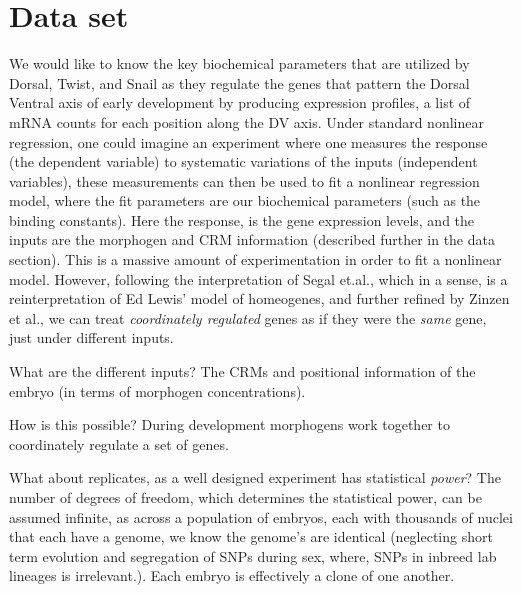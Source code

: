  \section{ Data set }

We would like to know the key biochemical parameters that are utilized by Dorsal, Twist, and Snail as they regulate the genes that pattern the Dorsal Ventral axis of early development by producing expression profiles, a list of mRNA counts for each position along the DV axis.  Under standard nonlinear regression, one could imagine an experiment where one measures the response (the dependent variable) to systematic variations of the inputs (independent variables), these measurements can then be used to fit a nonlinear regression model, where the fit parameters are our biochemical parameters (such as the binding constants).  Here the response, is the gene expression levels, and the inputs are the morphogen and CRM information (described further in the data section).  This is a massive amount of experimentation in order to fit a nonlinear model.  However, following the interpretation of Segal et.al.\cite{pmid18172436}, which in a sense, is a reinterpretation of Ed Lewis' model of homeogenes, and further refined by Zinzen et al.\cite{pmid16750631}, we can treat \emph{coordinately regulated} genes as if they were the \emph{same} gene, just under different inputs.  

What are the different inputs? The CRMs and positional information of the embryo (in terms of morphogen concentrations).  

How is this possible?  During development morphogens work together to coordinately regulate a set of genes.  

What about replicates, as a well designed experiment has statistical \emph{power}?  The number of degrees of freedom, which determines the statistical power, can be assumed infinite, as across a population of embryos, each with thousands of nuclei that each have a genome, we know the genome's are identical (neglecting short term evolution and segregation of SNPs during sex, where, SNPs in inbreed lab lineages is irrelevant.).  Each embryo is effectively a clone of one another.  

